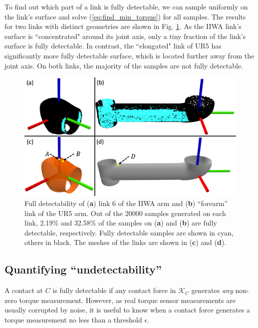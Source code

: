 To find out which part of a link is fully detectable, we can sample uniformly on the link's surface and solve (\ref{eq:find_min_torque}) for all samples. The results for two links with distinct geometries are shown in Fig. \ref{fig:full_observability}. As the IIWA link's surface is ``concentrated" around its joint axis, only a tiny fraction of the link's surface is fully detectable. In contrast, the ``elongated" link of UR5 has significantly more fully detectable surface, which is located further away from the joint axis. On both links, the majority of the samples are not fully detectable. 
\begin{figure}[h]
\vspace{-0.2cm}
\centering
\includegraphics[width=\linewidth]{figures/05_force_from_torque/full_observability.png}
\caption{Full detectability of (\textbf{a}) link 6 of the IIWA arm and (\textbf{b}) ``forearm'' link of the UR5 arm. Out of the 20000 samples generated on each link, 2.19\% and 32.58\% of the samples on (\textbf{a}) and (\textbf{b}) are fully detectable, respectively. Fully detectable samples are shown in cyan, others in black. The meshes of the links are shown in (\textbf{c}) and (\textbf{d}).}
\label{fig:full_observability}
\vspace{-0.5cm}
\end{figure}

\subsection{Quantifying ``undetectability''}
A contact at $C$ is fully detectable if any contact force in $\mathcal{K}_C$ generates \textit{any} non-zero torque measurement. However, as real torque sensor measurements are usually corrupted by noise, it is useful to know when a contact force generates a torque measurement no less than a threshold $\epsilon$.

